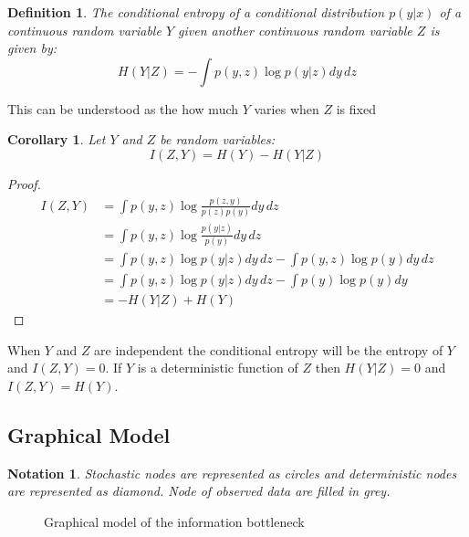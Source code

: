 \documentclass[10pt,oneside,openright]{report}
\newtheorem{notation}{Notation}
\newtheorem{definition}{Definition}
\newtheorem{corollary}{Corollary}
\begin{document}
\begin{definition}
The conditional entropy of a conditional distribution $p(y|x)$ of a continuous random variable $Y$ given another continuous random variable $Z$ is given by:
$$ H(Y|Z)  = -\int p(y, z) \log p(y|z) dy\,dz $$
\end{definition}
This can be understood as the how much $Y$ varies when $Z$ is fixed

\begin{corollary}
Let $Y$ and $Z$ be random variables:
\begin{equation}
I(Z, Y) = H(Y) - H(Y|Z)
\label{eq:mutual_info_cond_entropy}
\end{equation}
\end{corollary}

\begin{proof}
\begin{align}
I(Z, Y) &= \int p(y, z) \log \frac{p(z, y)}{p(z)p(y)} dy\,dz\\
& = \int p(y, z) \log \frac{p(y|z)}{p(y)} dy\,dz \label{eq:mi_zy}\\
&= \int p(y, z) \log p(y|z) dy\,dz - \int p(y, z) \log p(y) dy\,dz\\ 
&= \int p(y, z) \log p(y|z) dy\,dz - \int p(y) \log p(y) dy\\ 
&= - H(Y|Z) + H(Y)
\end{align}
\end{proof}

When $Y$ and $Z$ are independent the conditional entropy will be the entropy of $Y$ and $I(Z, Y) = 0$. If $Y$ is a deterministic function of $Z$ then $H(Y|Z) = 0$ and $I(Z, Y) = H(Y)$. 

\subsection{Graphical Model}
\begin{notation}
Stochastic nodes are represented as circles and deterministic nodes are represented as diamond. Node of observed data are filled in grey.
\end{notation}

\begin{figure}[H]
\centering
{}
\caption{Graphical model of the information bottleneck}
\end{figure}
\end{document}
